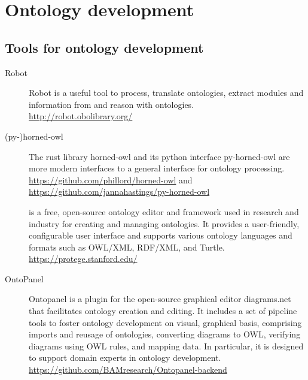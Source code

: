\section{Ontology development}








\subsection{Tools for ontology development}

\begin{description}
    \item[Robot] Robot is a useful tool to process, translate ontologies, extract modules and information from and reason with ontologies.\\ \url{http://robot.obolibrary.org/}
    \item[(py-)horned-owl] The rust library horned-owl and its python interface py-horned-owl are more modern interfaces to a general interface for ontology processing. \\ \url{https://github.com/phillord/horned-owl} and \\ \url{https://github.com/jannahastings/py-horned-owl}
    \item[{\protege}] {\protege} is a free, open-source ontology editor and framework used in research and industry for creating and managing ontologies. It provides a user-friendly, configurable user interface and supports various ontology languages and formats such as OWL/XML, RDF/XML, and Turtle. \\ \url{https://protege.stanford.edu/}
    \item[OntoPanel] Ontopanel is a plugin for the open-source graphical editor diagrams.net that facilitates ontology creation and editing. It includes a set of pipeline tools to foster ontology development on visual, graphical basis, comprising imports and reusage of ontologies, converting diagrams to OWL, verifying diagrams using OWL rules, and mapping data. \cite{ChenOntopanel2022} In particular, it is designed to support domain experts in ontology development. \\ \url{https://github.com/BAMresearch/Ontopanel-backend}
\end{description}
